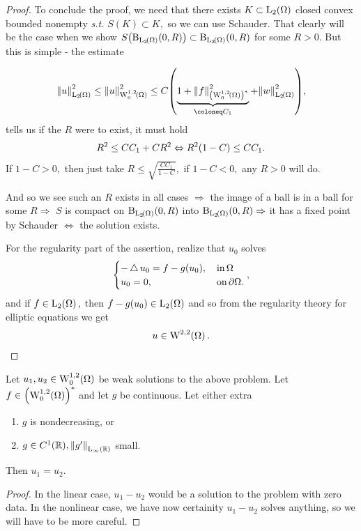 \documentclass{article}
\begin{document}
\begin{example}
\begin{proof}
To conclude the proof, we need that there exists $K \subset \LpSet[2]{\Omega}$ closed convex bounded nonempty \textit{s.t.} $S(K) \subset K,$ so we can use Schauder. That clearly will be the case when we show $S\qty(\text{B}_{\LpSet[2]{\Omega}}(0,R)) \subset \text{B}_{\LpSet[2]{\Omega}}(0,R)$ for some $R>0.$ But this is simple - the estimate

\[
	\norm{u}_{\LpSet[2]{\Omega}}^{2} \leq \norm{u}_{\WkpzeroSet[1][2]{\Omega}}^{2} \leq C\qty(\underbrace{1+\norm{f}_{\qty(\WkpzeroSet[1][2]{\Omega})^{*}}^{2}}_{\coloneq C_1} + \norm{w}_{\LpSet[2]{\Omega}}^{2}),
\]
tells us if the $R$ were to exist, it must hold
\[
	R^{2} \leq C C_1 + C R^{2} \Leftrightarrow R^{2}\qty(1-C)\leq C C_1.
\]
If $1-C >0,$ then just take $R \leq \sqrt{\frac{C C_1}{1-C}},$ if $1-C <0,$ any $R>0$ will do.

And so we see such an $R$ exists in all cases  $\Rightarrow$ the image of a ball is in a ball for some $R \Rightarrow$ $S$ is compact on $\text{B}_{\LpSet[2]{\Omega}}(0,R)$ into $\text{B}_{\LpSet[2]{\Omega}}(0,R) \Rightarrow $ it has a fixed point by Schauder $\Leftrightarrow$ the solution exists.

For the regularity part of the assertion, realize that $u_0$ solves 
\[
	\begin{cases}
		-\operatorname{\bigtriangleup} u_0 = f-g(u_0), & \, \text{in} \, \Omega \\
		u_0 = 0, & \, \text{on} \, \partial \Omega. 
	\end{cases},
\]
and if $f \in \LpSet[2]{\Omega},$ then $f-g\qty(u_0) \in \LpSet[2]{\Omega}$ and so from the regularity theory for elliptic equations we get
\[
	u \in \WkpSet[2][2]{\Omega}.
\]
\end{proof}

\begin{theorem}[Uniqueness]
	Let $u_1, u_2 \in \WkpzeroSet[1][2]{\Omega}$ be weak solutions to the above problem. Let $f \in \qty(\WkpzeroSet[1][2]{\Omega})^{*}$ and let $g$ be continuous. Let either extra 
	\begin{enumerate}
		\item $g$ is nondecreasing, or
		\item $g \in C^1\qty({\mathbb R}), \norm{g'}_{\text{L}_{\infty}\!\,\left({\mathbb R} \right)}$ small.
	\end{enumerate}
	Then $u_1 = u_2$.
\end{theorem}
\begin{proof}
	In the linear case, $u_1 - u_2$ would be a solution to the problem with zero data. In the nonlinear case, we have now certainity $u_1 - u_2$ solves anything, so we will have to be more careful.
	

\end{proof}
\end{example}
\end{document}
